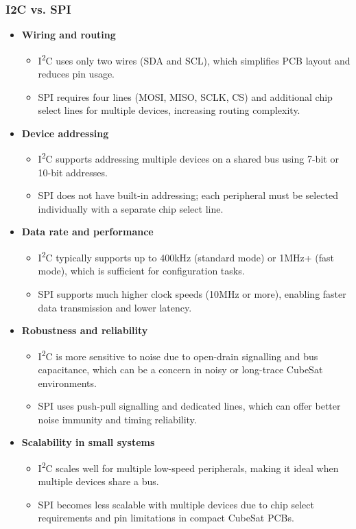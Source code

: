 \subsubsection{I2C vs. SPI}

\begin{itemize}
    \item \textbf{Wiring and routing}
    \begin{itemize}
        \item I\textsuperscript{2}C uses only two wires (SDA and SCL), which simplifies PCB layout and reduces pin usage.
        \item SPI requires four lines (MOSI, MISO, SCLK, CS) and additional chip select lines for multiple devices, increasing routing complexity.
    \end{itemize}

    \item \textbf{Device addressing}
    \begin{itemize}
        \item I\textsuperscript{2}C supports addressing multiple devices on a shared bus using 7-bit or 10-bit addresses.
        \item SPI does not have built-in addressing; each peripheral must be selected individually with a separate chip select line.
    \end{itemize}

    \item \textbf{Data rate and performance}
    \begin{itemize}
        \item I\textsuperscript{2}C typically supports up to 400kHz (standard mode) or 1MHz+ (fast mode), which is sufficient for configuration tasks.
        \item SPI supports much higher clock speeds (10MHz or more), enabling faster data transmission and lower latency.
    \end{itemize}

    \item \textbf{Robustness and reliability}
    \begin{itemize}
        \item I\textsuperscript{2}C is more sensitive to noise due to open-drain signalling and bus capacitance, which can be a concern in noisy or long-trace CubeSat environments.
        \item SPI uses push-pull signalling and dedicated lines, which can offer better noise immunity and timing reliability.
    \end{itemize}

    \item \textbf{Scalability in small systems}
    \begin{itemize}
        \item I\textsuperscript{2}C scales well for multiple low-speed peripherals, making it ideal when multiple devices share a bus.
        \item SPI becomes less scalable with multiple devices due to chip select requirements and pin limitations in compact CubeSat PCBs.
    \end{itemize}
\end{itemize}

